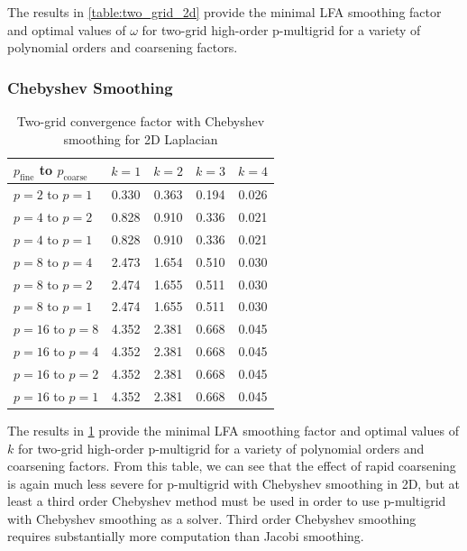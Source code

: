 \documentclass[review]{siamart190516}
\begin{document}
The results in \cref{table:two_grid_2d} provide the minimal LFA smoothing factor and optimal values of $\omega$ for two-grid high-order p-multigrid for a variety of polynomial orders and coarsening factors.

\subsubsection{Chebyshev Smoothing}

\begin{table}[ht!]
\begin{center}
\begin{tabular}{l c c c c}
  \toprule
  $p_{\text{fine}}$ to $p_{\text{coarse}}$  &  $k = 1$   &  $k = 2$   &  $k = 3$   &  $k = 4$   \\
  \toprule
  $p = 2$ to $p = 1$   &  0.330  &  0.363  &  0.194  &  0.026  \\
  \midrule
  $p = 4$ to $p = 2$   &  0.828  &  0.910  &  0.336  &  0.021  \\
  $p = 4$ to $p = 1$   &  0.828  &  0.910  &  0.336  &  0.021  \\
  \midrule
  $p = 8$ to $p = 4$   &  2.473  &  1.654  &  0.510  &  0.030  \\
  $p = 8$ to $p = 2$   &  2.474  &  1.655  &  0.511  &  0.030  \\
  $p = 8$ to $p = 1$   &  2.474  &  1.655  &  0.511  &  0.030  \\
  \midrule
  $p = 16$ to $p = 8$  &  4.352  &  2.381  &  0.668  &  0.045  \\
  $p = 16$ to $p = 4$  &  4.352  &  2.381  &  0.668  &  0.045  \\
  $p = 16$ to $p = 2$  &  4.352  &  2.381  &  0.668  &  0.045  \\
  $p = 16$ to $p = 1$  &  4.352  &  2.381  &  0.668  &  0.045  \\
  \bottomrule
\end{tabular}
\end{center}
\caption{Two-grid convergence factor with Chebyshev smoothing for 2D Laplacian}
\label{table:two_grid_2d_chebyshev}
\end{table}

The results in \cref{table:two_grid_2d_chebyshev} provide the minimal LFA smoothing factor and optimal values of $k$ for two-grid high-order p-multigrid for a variety of polynomial orders and coarsening factors.
From this table, we can see that the effect of rapid coarsening is again much less severe for p-multigrid with Chebyshev smoothing in 2D, but at least a third order Chebyshev method must be used in order to use p-multigrid with Chebyshev smoothing as a solver.
Third order Chebyshev smoothing requires substantially more computation than Jacobi smoothing.
\end{document}
